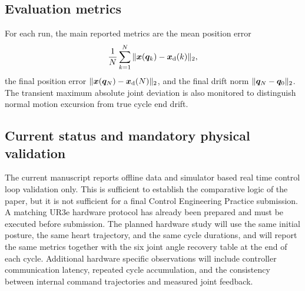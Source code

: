 \subsection{Evaluation metrics}

For each run, the main reported metrics are the mean position error
\begin{equation}
  \frac{1}{N}\sum_{k=1}^{N}\|\bm{x}(\bm{q}_k)-\bm{x}_{\mathrm{d}}(k)\|_2,
\end{equation}
the final position error $\|\bm{x}(\bm{q}_N)-\bm{x}_{\mathrm{d}}(N)\|_2$, and the final drift norm $\|\bm{q}_N-\bm{q}_0\|_2$. The transient maximum absolute joint deviation is also monitored to distinguish normal motion excursion from true cycle end drift.

\subsection{Current status and mandatory physical validation}

The current manuscript reports offline data and simulator based real time control loop validation only. This is sufficient to establish the comparative logic of the paper, but it is not sufficient for a final Control Engineering Practice submission. A matching UR3e hardware protocol has already been prepared and must be executed before submission. The planned hardware study will use the same initial posture, the same heart trajectory, and the same cycle durations, and will report the same metrics together with the six joint angle recovery table at the end of each cycle. Additional hardware specific observations will include controller communication latency, repeated cycle accumulation, and the consistency between internal command trajectories and measured joint feedback.
